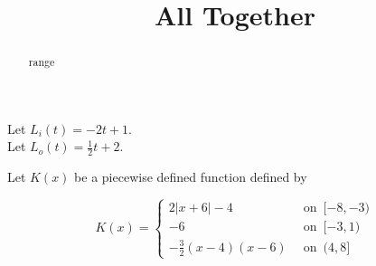 \documentclass{ximera}
\title{All Together}
\begin{document}
\begin{abstract}
range
\end{abstract}
\maketitle








Let $L_i(t) = -2t + 1$. \\
Let $L_o(t) = \frac{1}{2}t + 2$.


Let $K(x)$ be a piecewise defined function defined by 


\[
K(x) = 
\begin{cases}
  2|x+6| - 4         &    \,     \text{ on } \,   [-8,-3)    \\
  -6               &    \,     \text{ on } \,    [-3,1)      \\
  -\frac{3}{2}(x-4)(x-6)    &   \,     \text{ on } \,    (4,8]
\end{cases}
\]
\end{document}

